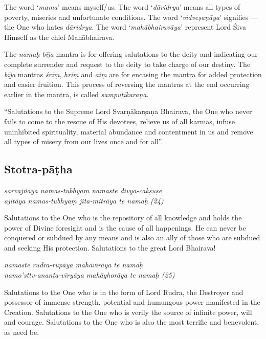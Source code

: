 \documentclass[11pt,oneside,a4paper]{article}
\newenvironment{shloka}[1]
  {\bigskip\center#1\varwidth{\linewidth}}
  {\endvarwidth\endcenter\bigskip}
\newcommand{\tl}[1]{\emph{#1}}
\begin{document}
The word ‘\tl{mama}’ means myself/us. The word ‘\tl{dāridrya}’ means all types
of poverty, miseries and unfortunate conditions. The word ‘\tl{vidveṣaṇāya}’
signifies — the One who hates \tl{dāridrya}. The word ‘\tl{mahābhairavāya}’
represent Lord Śiva Himself as the chief Mahābhairava.

The \tl{namaḥ bīja} mantra is for offering salutations to the deity and
indicating our complete surrender and request to the deity to take charge of
our destiny. The \tl{bīja} mantras \tl{śrīṃ}, \tl{hrīṃ} and \tl{aiṃ} are for
encasing the mantra for added protection and easier fruition. This process of
reversing the mantras at the end occurring earlier in the mantra, is called
\tl{sampuṭīkaraṇa}.

``Salutations to the Supreme Lord Svarṇākarṣaṇa Bhairava, the One who never
fails to come to the rescue of His devotees, relieve us of all karmas, infuse
uninhibited spirituality, material abundance and contentment in us and remove
all types of misery from our lives once and for all''.

\subsection{Stotra-pāṭha}

\begin{shloka}\itshape
  sarvajñāya namas-tubhyaṃ namaste divya-cakṣuṣe\\
  ajitāya namas-tubhyaṃ jita-mitrāya te namaḥ (24)
\end{shloka}

Salutations to the One who is the repository of all knowledge and holds
the power of Divine foresight and is the cause of all happenings. He can never
be conquered or subdued by any means and is also an ally of those who are
subdued and seeking His protection. Salutations to the great Lord Bhairava!

\begin{shloka}\itshape
  namaste rudra-rūpāya mahāvīrāya te namaḥ\\
  namo'sttv-ananta-vīryāya mahāghorāya te namaḥ (25)
\end{shloka}

Salutations to the One who is in the form of Lord Rudra, the Destroyer and
possessor of immense strength, potential and humungous power manifested in
the Creation. Salutations to the One who is verily the source of infinite power,
will and courage. Salutations to the One who is also the most terrific and
benevolent, as need be.
\end{document}
